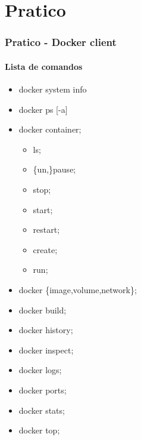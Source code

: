 \section{Pratico}

\begin{frame}[t]
	\frametitle{Pratico - Docker client}
	\framesubtitle{Lista de comandos}
\begin{multicols}{2}
	\begin{itemize}
		\item docker system info
		\item docker ps [-a]
		\item docker container;
			\begin{itemize}
				\item ls;
				\item \{un,\}pause;
				\item stop;
				\item start;
				\item restart;
				\item create;
				\item run;
			\end{itemize}
		\item docker \{image,volume,network\};
		\item docker build;
	\end{itemize}
	\columnbreak
	\begin{itemize}
		\item docker history;
		\item docker inspect;
		\item docker logs;
		\item docker ports;
		\item docker stats;
		\item docker top;
	\end{itemize}
\end{multicols}
\end{frame}

